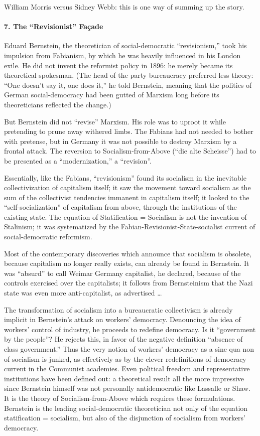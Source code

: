 William Morris versus Sidney Webb: this is one way of summing up the story.

\paragraph{7. The ``Revisionist'' Fa\c{c}ade}

Eduard Bernstein, the theoretician of social-democratic ``revisionism,'' took his impulsion from Fabianism, by which he was heavily influenced in his London exile. He did not invent the reformist policy in 1896: he merely became its theoretical spokesman. (The head of the party bureaucracy preferred less theory: ``One doesn't say it, one does it,'' he told Bernstein, meaning that the politics of German social-democracy had been gutted of Marxism long before its theoreticians reflected the change.)

But Bernstein did not ``revise'' Marxism. His role was to uproot it while pretending to prune away withered limbs. The Fabians had not needed to bother with pretense, but in Germany it was not possible to destroy Marxism by a frontal attack. The reversion to Socialism-from-Above (``die alte Scheisse'') had to be presented as a ``modernization,'' a ``revision''.

Essentially, like the Fabians, ``revisionism'' found its socialism in the inevitable collectivization of capitalism itself; it saw the movement toward socialism as the sum of the collectivist tendencies immanent in capitalism itself; it looked to the ``self-socialization'' of capitalism from above, through the institutions of the existing state. The equation of Statification = Socialism is not the invention of Stalinism; it was systematized by the Fabian-Revisionist-State-socialist current of social-democratic reformism.

Most of the contemporary discoveries which announce that socialism is obsolete, because capitalism no longer really exists, can already be found in Bernstein. It was ``absurd'' to call Weimar Germany capitalist, he declared, because of the controls exercised over the capitalists; it follows from Bernsteinism that the Nazi state was even more anti-capitalist, as advertised \ldots\

The transformation of socialism into a bureaucratic collectivism is already implicit in Bernstein's attack on workers' democracy. Denouncing the idea of workers' control of industry, he proceeds to redefine democracy. Is it ``government by the people''? He rejects this, in favor of the negative definition ``absence of class government.'' Thus the very notion of workers' democracy as a sine qua non of socialism is junked, as effectively as by the clever redefinitions of democracy current in the Communist academies. Even political freedom and representative institutions have been defined out: a theoretical result all the more impressive since Bernstein himself was not personally antidemocratic like Lassalle or Shaw. It is the theory of Socialism-from-Above which requires these formulations. Bernstein is the leading social-democratic theoretician not only of the equation statification = socialism, but also of the disjunction of socialism from workers' democracy.

